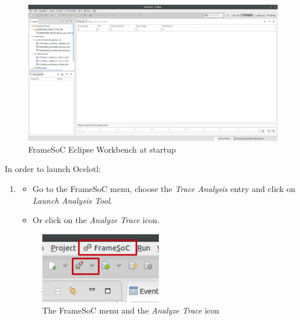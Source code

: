\documentclass[twoside]{article}
\begin{document}
\begin{sloppypar}
\begin{figure}[h!]
	\centering
    \includegraphics[width=1.0\textwidth]{images/framesoc_launch.png}
	\caption{FrameSoC Eclipse Workbench at startup}
	\label{frameLaunch}
\end{figure}

In order to launch Ocelotl:
\begin{enumerate}
	\item 
	\begin{itemize}
		\item Go to the FrameSoC menu, choose the \textit{Trace Analysis} entry and click on \textit{Launch Analysis Tool}. 
		\item Or click on the \textit{Analyze Trace} icon.
	\end{itemize}

	\begin{figure}[h!]
		\centering
		\includegraphics[scale=0.5]{images/labeled.png}
		\caption{The FrameSoC menu and the \textit{Analyze Trace} icon}
		\label{launchOcelotl}
	\end{figure}
	

\end{enumerate}
\end{sloppypar}
\end{document}
